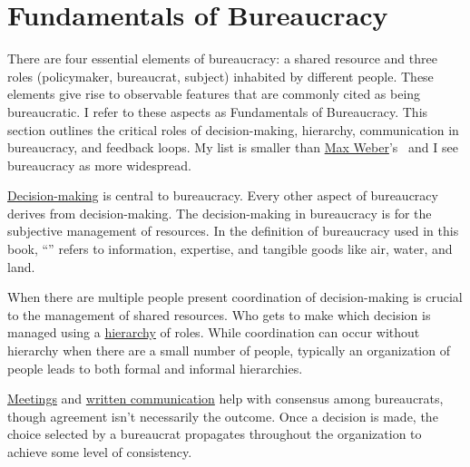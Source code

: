 \section{Fundamentals of Bureaucracy\label{sec:fundamentals-of-b}}

There are four essential elements of bureaucracy: a shared resource and three roles (policymaker, bureaucrat, subject) inhabited by different people. These elements give rise to observable features that are commonly cited as being bureaucratic. I refer to these aspects as Fundamentals of Bureaucracy.
This section outlines the critical roles of decision-making, hierarchy, communication in bureaucracy, and feedback loops. 
My list is smaller than \href{https://en.wikipedia.org/wiki/Bureaucracy\%23Max_Weber}{Max Weber}'s~\cite{2015_Weber}
 and I see bureaucracy as more widespread.

\hyperref[sec:decision-making]{Decision-making}
%
is central to bureaucracy. Every other aspect of bureaucracy derives from decision-making. 
The decision-making in bureaucracy is for the subjective management of resources. In the definition of bureaucracy used in this book, ``\iftoggle{glossarysubstitutionworks}{\glspl{shared resource}}{shared resources}'' 
\iftoggle{glossaryinmargin}{\marginpar{[Glossary]}}{}%
refers to information, expertise, and tangible goods like air, water, and land. 

When there are multiple people present 
coordination of decision-making is crucial to the management of shared resources. Who gets to make which decision is managed using a
\hyperref[sec:hierarchy-of-roles]{hierarchy} of roles.
%
While coordination can occur without hierarchy when there are a small number of people, typically an organization of people leads to both formal and informal hierarchies. 

\hyperref[sec:meetings-for-coordination]{Meetings} and 
%
\hyperref[sec:written-communication]{written communication} help with consensus among bureaucrats, though agreement isn't necessarily the outcome.
Once a decision is made, the choice selected by a bureaucrat propagates throughout the organization to achieve some level of consistency. 

